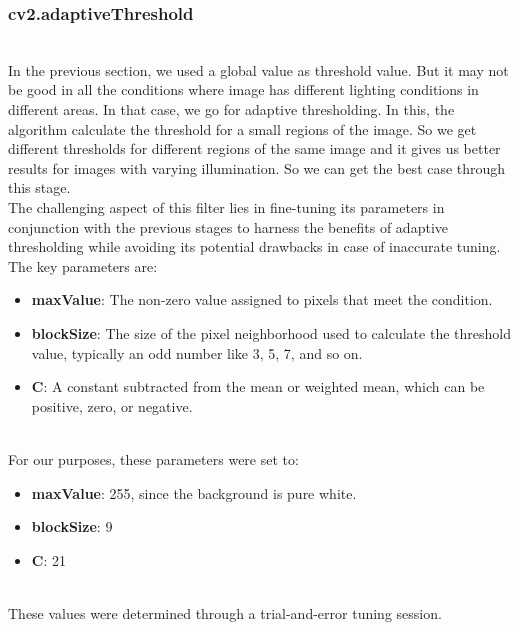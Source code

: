 \newpage
\hypertarget{cv2.adaptivethreshold}{%
\subsubsection{cv2.adaptiveThreshold}\label{cv2.adaptivethreshold}}\\

\quad In the previous section, we used a global value as threshold value. But
it may not be good in all the conditions where image has different
lighting conditions in different areas. In that case, we go for adaptive
thresholding. In this, the algorithm calculate the threshold for a small
regions of the image. So we get different thresholds for different
regions of the same image and it gives us better results for images with
varying illumination. So we can get the best case through this stage.\\

\quad The challenging aspect of this filter lies in fine-tuning its parameters
in conjunction with the previous stages to harness the benefits of
adaptive thresholding while avoiding its potential drawbacks in case of
inaccurate tuning. The key parameters are:\\

\begin{itemize}
\item
  \textbf{maxValue}: The non-zero value assigned to pixels that meet the
  condition.
\item
  \textbf{blockSize}: The size of the pixel neighborhood used to
  calculate the threshold value, typically an odd number like 3, 5, 7,
  and so on.
\item
  \textbf{C}: A constant subtracted from the mean or weighted mean,
  which can be positive, zero, or negative.
\end{itemize}\\

\quad For our purposes, these parameters were set to:\\

\begin{itemize}
\item
  \textbf{maxValue}: 255, since the background is pure white.
\item
  \textbf{blockSize}: 9
\item
  \textbf{C}: 21
\end{itemize}\\

\quad These values were determined through a trial-and-error tuning session.\\

